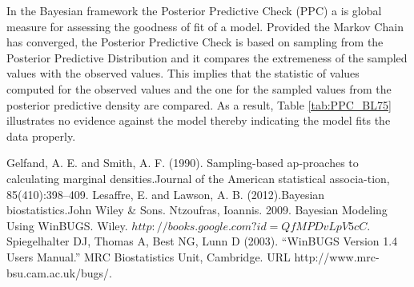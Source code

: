 \documentclass[11pt]{article}
\begin{document}
 In the Bayesian framework the Posterior Predictive Check (PPC) a is global measure for assessing the goodness of fit of a model. Provided the Markov Chain has converged, the Posterior Predictive Check is based on sampling from the  Posterior Predictive Distribution and it compares the extremeness of the sampled values with the observed values. This implies that the statistic of values computed for the observed values and the one for the sampled values from the posterior predictive density are compared. As a result, Table \ref{tab:PPC_BL75} illustrates no evidence against the model thereby indicating the model fits the data properly. \\







\begin{thebibliography}{}
 Gelfand,  A.  E.  and  Smith,  A.  F.  (1990).  Sampling-based ap-proaches to calculating marginal densities.Journal of the American statistical associa-tion, 85(410):398–409.
 Lesaffre, E. and Lawson, A. B. (2012).Bayesian biostatistics.John Wiley & Sons.
Ntzoufras, Ioannis. 2009. Bayesian Modeling Using WinBUGS. Wiley.
$http://books.google.com?id=QfMPDvLpV5cC.$
Spiegelhalter DJ, Thomas A, Best NG, Lunn D (2003). “WinBUGS Version 1.4 Users Manual.”
MRC Biostatistics Unit, Cambridge. URL http://www.mrc-bsu.cam.ac.uk/bugs/.

\end{thebibliography}
\end{document}
